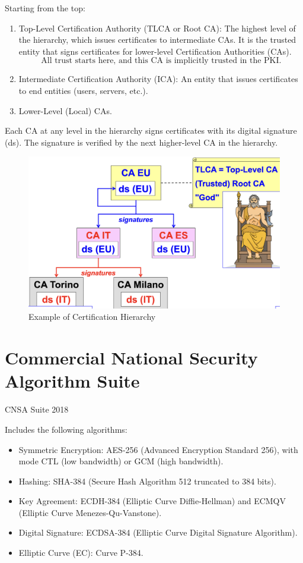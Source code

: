 Starting from the top:
\begin{enumerate}
    \item Top-Level Certification Authority (TLCA or Root CA): The highest level of the hierarchy, which issues certificates to intermediate CAs. It is the trusted entity that signs certificates for lower-level Certification Authorities (CAs). 
    \[
        \text{All trust starts here, and this CA is implicitly trusted in the PKI.}
    \]
    \item Intermediate Certification Authority (ICA): An entity that issues certificates to end entities (users, servers, etc.).
    \item Lower-Level (Local) CAs.
\end{enumerate}
\begin{tcolorbox}[colback=red!10!white, colframe=red!70!black, coltitle=white, title=Beware]
    Each CA at any level in the hierarchy signs certificates with its digital signature (ds). The signature is verified by the next higher-level CA in the hierarchy.
\end{tcolorbox}
\begin{figure}[H]
    \centering
    \includegraphics[width=0.5\linewidth]{Images/Cryptography/cert_hier.png}
    \caption{Example of Certification Hierarchy}
    \label{fig:cert_hier}
\end{figure}

\section{Commercial National Security Algorithm Suite}
\begin{center}
    CNSA Suite 2018
\end{center}
Includes the following algorithms:
\begin{itemize}
    \item Symmetric Encryption: AES-256 (Advanced Encryption Standard 256), with mode CTL (low bandwidth) or GCM (high bandwidth).
    \item Hashing: SHA-384 (Secure Hash Algorithm 512 truncated to 384 bits).
    \item Key Agreement: ECDH-384 (Elliptic Curve Diffie-Hellman) and ECMQV (Elliptic Curve Menezes-Qu-Vanstone).
    \item Digital Signature: ECDSA-384 (Elliptic Curve Digital Signature Algorithm).
    \item Elliptic Curve (EC): Curve P-384.
    \end{itemize}
    
